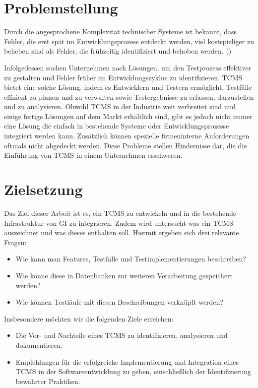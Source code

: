 \documentclass[a4paper, fontsize=11pt, parskip=half, twoside, headings=openright]{scrreprt}
\begin{document}
	\section{Problemstellung}
	Durch die angesprochene Komplexität technischer Systeme ist bekannt, dass Fehler, die erst spät im Entwicklungsprozess entdeckt werden, viel kostspieliger zu beheben sind als Fehler, die frühzeitig identifiziert und behoben werden. (\textcite{westland_cost_2002})
	
	Infolgedessen suchen Unternehmen nach Lösungen, um den Testprozess effektiver zu gestalten und Fehler früher im Entwicklungszyklus zu identifizieren. 
	\ac{TCMS} bietet eine solche Lösung, indem es Entwicklern und Testern ermöglicht, Testfälle effizient zu planen und zu verwalten sowie Testergebnisse zu erfassen, darzustellen und zu analysieren. 
	Obwohl \ac{TCMS} in der Industrie weit verbreitet sind und einige fertige Lösungen auf dem Markt erhältlich sind, gibt es jedoch nicht immer eine Lösung die einfach in bestehende Systeme oder Entwicklungsprozesse integriert werden kann. 
	Zusätzlich können spezielle firmeninterne Anforderungen oftmals nicht abgedeckt werden.
	Diese Probleme stellen Hindernisse dar, die die Einführung von \ac{TCMS} in einem Unternehmen erschweren. 
	
	\section{Zielsetzung}
	Das Ziel dieser Arbeit ist es, ein \ac{TCMS} zu entwickeln und in die bestehende Infrastruktur von \ac{GI} zu integrieren.
	Zudem wird untersucht was ein \ac{TCMS} auszeichnet und was dieses enthalten soll.
	Hiermit ergeben sich drei relevante Fragen:
	
	\begin{itemize}
		\item Wie kann man Features, Testfälle und Testimplementierungen beschreiben? 
		\item Wie könne diese in Datenbanken zur weiteren Verarbeitung gespeichert werden? 
		\item Wie können Testläufe mit diesen Beschreibungen verknüpft werden?
	\end{itemize}
	
	Insbesondere möchten wir die folgenden Ziele erreichen:
	
	\begin{itemize}
		\item Die Vor- und Nachteile eines \ac{TCMS} zu identifizieren, analysieren und dokumentieren.
		\item Empfehlungen für die erfolgreiche Implementierung und Integration eines \ac{TCMS} in der Softwareentwicklung zu geben, einschließlich der Identifizierung bewährter Praktiken.
	\end{itemize}
	
\end{document}
